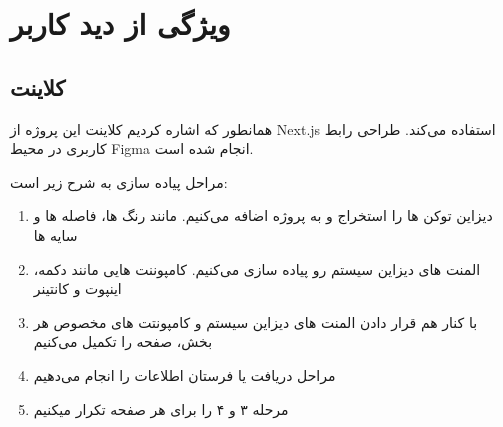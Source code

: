 \chapter{ویژگی از دید کاربر}

\section{کلاینت}
همانطور که اشاره کردیم کلاینت این پروژه از Next.js استفاده می‌کند.
طراحی رابط کاربری در محیط Figma انجام شده است.


مراحل پیاده سازی به شرح زیر است:
\begin{enumerate}
    \item دیزاین توکن ها را استخراج و به پروژه اضافه می‌کنیم. مانند رنگ ها، فاصله ها و سایه ها
    \item المنت های دیزاین سیستم رو پیاده سازی می‌کنیم. کامپوننت هایی مانند دکمه، اینپوت و کانتینر
    \item با کنار هم قرار دادن المنت های دیزاین سیستم و کامپونتت های مخصوص هر بخش، صفحه را تکمیل می‌کنیم
    \item مراحل دریافت یا فرستان اطلاعات را انجام می‌دهیم
    \item مرحله ۳ و ۴ را برای هر صفحه تکرار میکنیم
\end{enumerate}

\newpage


